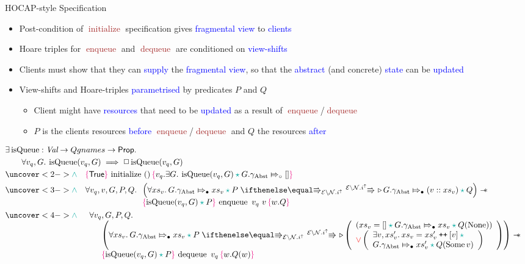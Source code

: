 \documentclass[9pt,xcolor={dvipsnames}]{beamer}
\newcommand{\initialise}{\operatorname{initialize}}
\newcommand{\enqueue}{\operatorname{enqueue}}
\newcommand{\dequeue}{\operatorname{dequeue}}
\newcommand{\isqueue}{\operatorname{isQueue}}
\newcommand{\Qgnames}{Qgnames}
\newcommand{\vq}{v_q}
\newcommand{\nodeval}{\valB}
\newcommand{\absvalue}{\val}
\newcommand{\absvalueList}{xs_v}
\newcommand{\Qg}{G}
\newcommand{\gabst}{\gname_{\mathrm{Abst}}}
\newcommand\catenate{\mathbin{\text{\ttfamily\upshape ++}}}
\newcommand{\Nl}{\ensuremath{\mathcal{N}}}
\newcommand{\abstractstatefullfrag}[2]{#1 \Mapsto_{\circ} #2}
\newcommand{\abstractstateauth}[2]{#1 \Mapsto_{\bullet} #2}
\newcommand{\hocapspecinitHTGen}[2]{\hoare{\TRUE}{\initialise \ \TT}{#1 . \Exists #2 . \isqueue(#1, #2) \star{} \abstractstatefullfrag{#2.\gabst}{[]}}}
\newcommand{\hocapspecinitGen}[2]{\hocapspecinitHTGen{#1}{#2}}
\newcommand{\hocapspecinit}{\hocapspecinitGen{\vq}{\Qg}}
\newcommand{\hocapspecenqVS}[5]{\abstractstateauth{#2.\gabst}{#5} \star{} #3 \vs[\mask\setminus\Nl.i^\uparrow] \later \abstractstateauth{#2.\gabst}{(#1 :: #5)} \star{} #4}
\newcommand{\hocapspecenqHT}[5]{\hoare{\isqueue(#1, #3) \star{} #4}{\enqueue \ #1 \ #2}{\valB . #5}}
\newcommand{\hocapspecenqGen}[6]{\All #1, #2, #3, #4, #5.
\begin{array}[t]{l}
\left(\All #6 . \hocapspecenqVS{#2}{#3}{#4}{#5}{#6} \right)
\wand\\
\hocapspecenqHT{#1}{#2}{#3}{#4}{#5}
\end{array}}
\newcommand{\hocapspecenq}{\hocapspecenqGen{\vq}{\absvalue}{\Qg}{P}{Q}{\absvalueList}}
\newcommand{\hocapspecdeqVSGen}[6]{
  \abstractstateauth{#1.\gabst}{#4} \star{} #2 \vs[\mask\setminus\Nl.i^\uparrow] \later
  \left(
    \begin{array}{l}
      (#4 = [] \star{} \abstractstateauth{#1.\gabst}{#4} \star{} #3(\None))\\
      \lor{}
      \left(
        \begin{array}{l}
          \Exists #5, #6 . #4 = #6 \catenate [#5] \star{}\\
          \abstractstateauth{#1.\gabst}{#6} \star{} #3(\Some{#5})
        \end{array}
        \right)
    \end{array}
  \right)
}
\newcommand{\hocapspecdeqVS}[4]{\hocapspecdeqVSGen{#1}{#2}{#3}{#4}{\absvalue}{#4'}}
\newcommand{\hocapspecdeqHT}[4]{\hoare{\isqueue(#1, #2) \star{} #3}{\dequeue \ #1}{\nodeval . #4(\nodeval)}}
\newcommand{\hocapspecdeqGen}[5]{\begin{array}[t]{l}
  \All #1, #2, #3, #4.\\
  \begin{array}[t]{l}
  \quad\left(\All #5 . \hocapspecdeqVS{#2}{#3}{#4}{#5} \right) \wand\\
  \quad\hocapspecdeqHT{#1}{#2}{#3}{#4}
  \end{array}
\end{array}}
\newcommand{\hocapspecdeq}{\hocapspecdeqGen{\vq}{\Qg}{P}{Q}{\absvalueList}}
\let\oldlor\lor
\renewcommand{\lor}{\begingroup \color{red} \oldlor \endgroup}
\let\oldland\land
\renewcommand{\land}{\begingroup \color{Emerald} \oldland \endgroup}
\let\oldstar\star
\renewcommand{\star}{\begingroup \color{Emerald} \oldstar \endgroup}
\begin{document}
\begin{frame}{HOCAP-style Specification}
  \begin{itemize}
    \item Post-condition of \textcolor{Brown}{$\initialise$} specification gives \textcolor{blue}{fragmental view} to \textcolor{blue}{clients}
    \item Hoare triples for \textcolor{Brown}{$\enqueue$} and \textcolor{Brown}{$\dequeue$} are conditioned on \textcolor{blue}{view-shifts}
    \item Clients must show that they can \textcolor{blue}{supply} the \textcolor{blue}{fragmental view}, so that the \textcolor{blue}{abstract} (and concrete) \textcolor{blue}{state} can be \textcolor{blue}{updated}
    \item View-shifts and Hoare-triples \textcolor{blue}{parametrised} by predicates \textcolor{RubineRed}{$P$} and \textcolor{RubineRed}{$Q$}
      \begin{itemize}
        \item Client might have \textcolor{blue}{resources} that need to be \textcolor{blue}{updated} as a result of \textcolor{Brown}{$\enqueue$}/\textcolor{Brown}{$\dequeue$}
        \item \textcolor{RubineRed}{$P$} is the clients resources \textcolor{blue}{before} \textcolor{Brown}{$\enqueue$}/\textcolor{Brown}{$\dequeue$} and \textcolor{RubineRed}{$Q$} the resources \textcolor{blue}{after}
      \end{itemize}
  \end{itemize}
  \vspace{-4pt}
  \begin{definition}\label{QueueSpecs:spec:hocap}
    \setlength\abovedisplayskip{-8pt}
    \setlength\belowdisplayskip{2pt}
    \fontsize{7pt}{9}\selectfont
    \begin{align*}
      &\Exists \isqueue : \Val \to \Qgnames \to \Prop.\\
      &\quad\quad \All \vq, \Qg . \isqueue(\vq, \Qg) \implies \persistently \isqueue(\vq, \Qg)\\
      &\uncover<2->{\land{}\quad\hocapspecinit}\\
      &\uncover<3->{\land{}\quad\hocapspecenq}\\
      &\uncover<4->{\land{}\quad\hocapspecdeq}
    \end{align*}
  \end{definition}
\end{frame}
\end{document}
